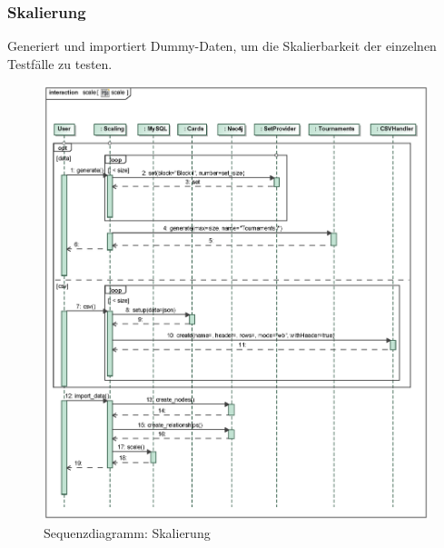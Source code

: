 \subsubsection{Skalierung}
Generiert und importiert Dummy-Daten, um die Skalierbarkeit der einzelnen Testfälle zu testen.
\begin{figure}[H]
    \myfloatalign
    \includegraphics[width=1.1\textwidth]{gfx/MtGDeepAnalysis/cli_scale.eps}
    \caption{Sequenzdiagramm: Skalierung}
    \label{fig:seq:scale}
\end{figure}

